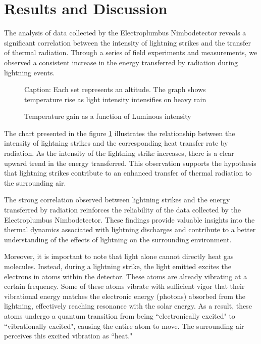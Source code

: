 \documentclass[english]{cenarticle} %
\begin{document}
\section{Results and Discussion}
%
The analysis of data collected by the Electroplumbus Nimbodetector reveals a significant correlation between the intensity of lightning strikes and the transfer of thermal radiation. Through a series of field experiments and measurements, we observed a consistent increase in the energy transferred by radiation during lightning events.\par
%
\begin{figure}[!h]
  \caption{Temperature gain as a function of Luminous intensity}  
  {\footnotesize Caption: Each set represents an altitude. The graph shows temperature rise as light intensity intensifies on heavy rain}
  \label{fig:graph}
\end{figure}
%
The chart presented in the figure \ref{fig:graph} illustrates the relationship between the intensity of lightning strikes and the corresponding heat transfer rate by radiation. As the intensity of the lightning strike increases, there is a clear upward trend in the energy transferred. This observation supports the hypothesis that lightning strikes contribute to an enhanced transfer of thermal radiation to the surrounding air.\par
%
The strong correlation observed between lightning strikes and the energy transferred by radiation reinforces the reliability of the data collected by the Electroplumbus Nimbodetector. These findings provide valuable insights into the thermal dynamics associated with lightning discharges and contribute to a better understanding of the effects of lightning on the surrounding environment.\par
%
Moreover, it is important to note that light alone cannot directly heat gas molecules. Instead, during a lightning strike, the light emitted excites the electrons in atoms within the detector. These atoms are already vibrating at a certain frequency. Some of these atoms vibrate with sufficient vigor that their vibrational energy matches the electronic energy (photons) absorbed from the lightning, effectively reaching resonance with the solar energy. As a result, these atoms undergo a quantum transition from being ``electronically excited" to ``vibrationally excited", causing the entire atom to move. The surrounding air perceives this excited vibration as ``heat."\par
\end{document}
